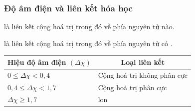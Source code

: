 \subsubsection{Độ âm điện và liên kết hóa học}

\begin{ghinho}
	 là liên kết cộng hoá trị trong đó  về phía nguyên tử nào.
	
	 là liên kết cộng hoá trị trong đó  về phía nguyên tử có .
\end{ghinho}


\begin{center}
	\begin{tabular}{|l|l|}
	\hline \multicolumn{1}{|c|}{\textbf{Hiệu độ âm điện $(\Delta \chi)$}}  &  \multicolumn{1}{c|}{\textbf{Loại liên kết}}  \\
	\hline $0 \leq \Delta \chi<0,4$ & Cộng hoá trị không phân cực \\
	\hline $0,4 \leq \Delta \chi<1,7$ & Cộng hoá trị phân cực \\
	\hline$\Delta \chi \geq 1,7$ & lon \\
	\hline
	\end{tabular}
\end{center}
